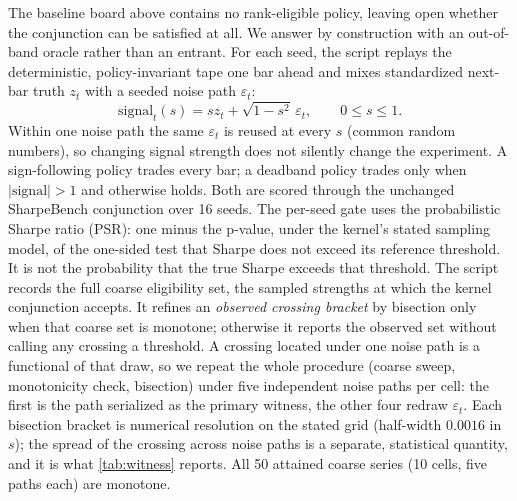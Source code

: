 The baseline board above contains no rank-eligible policy, leaving open whether the conjunction can be satisfied at all. We answer by construction with an out-of-band oracle rather than an entrant. For each seed, the script replays the deterministic, policy-invariant tape one bar ahead and mixes standardized next-bar truth $z_t$ with a seeded noise path $\varepsilon_t$:
\[
\mathrm{signal}_t(s)=s z_t+\sqrt{1-s^2}\,\varepsilon_t,
\qquad 0\le s\le1.
\]
Within one noise path the same $\varepsilon_t$ is reused at every $s$ (common random numbers), so changing signal strength does not silently change the experiment. A sign-following policy trades every bar; a deadband policy trades only when $|\mathrm{signal}|>1$ and otherwise holds. Both are scored through the unchanged SharpeBench conjunction over 16 seeds. The per-seed gate uses the probabilistic Sharpe ratio (PSR): one minus the p-value, under the kernel's stated sampling model, of the one-sided test that Sharpe does not exceed its reference threshold. It is not the probability that the true Sharpe exceeds that threshold. The script records the full coarse eligibility set, the sampled strengths at which the kernel conjunction accepts. It refines an \emph{observed crossing bracket} by bisection only when that coarse set is monotone; otherwise it reports the observed set without calling any crossing a threshold. A crossing located under one noise path is a functional of that draw, so we repeat the whole procedure (coarse sweep, monotonicity check, bisection) under five independent noise paths per cell: the first is the path serialized as the primary witness, the other four redraw $\varepsilon_t$. Each bisection bracket is numerical resolution on the stated grid (half-width $0.0016$ in $s$); the spread of the crossing across noise paths is a separate, statistical quantity, and it is what \cref{tab:witness} reports. All 50 attained coarse series (10 cells, five paths each) are monotone.

